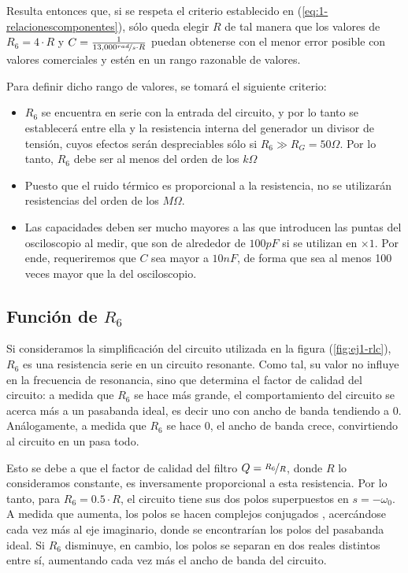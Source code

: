 \documentclass[../../tc_tp3_main.tex]{subfiles}
\begin{document}
 Resulta entonces que, si se respeta el criterio establecido en (\ref{eq:1-relacionescomponentes}), s\'olo queda elegir $R$ de tal manera que los valores de $R_6 = 4\cdot R$ y $C = \frac{1}{13,000 \nicefrac{rad}{s} \cdot R}$ puedan obtenerse con el menor error posible con valores comerciales y est\'en en un rango razonable de valores. \par
 
 Para definir dicho rango de valores, se tomar\'a el siguiente criterio:
 
 \begin{itemize}
	\item  $R_6$ se encuentra en serie con la entrada del circuito, y por lo tanto se establecer\'a entre ella y la resistencia interna del generador un divisor de tensi\'on, cuyos efectos ser\'an despreciables s\'olo si $R_6 \gg R_G = 50\Omega$. Por lo tanto, $R_6$ debe ser al menos del orden de los $k \Omega$
	\item Puesto que el ruido t\'ermico es proporcional a la resistencia, no se utilizar\'an resistencias del orden de los $M\Omega$.
  	\item Las capacidades deben ser mucho mayores a las que introducen las puntas del osciloscopio al medir, que son de alrededor de $100pF$ si se utilizan en $\times 1$. Por ende, requeriremos que $C$ sea mayor a $10nF$, de forma que sea al menos 100 veces mayor que la del osciloscopio. 
 \end{itemize}



\subsection{Funci\'on de $R_6$}


Si consideramos la simplificaci\'on del circuito utilizada en la figura (\ref{fig:ej1-rlc}), $R_6$ es una resistencia serie en un circuito resonante. Como tal, su valor no influye en la frecuencia de resonancia, sino que determina el factor de calidad del circuito: a medida que $R_6$ se hace m\'as grande, el comportamiento del circuito se acerca m\'as a un pasabanda ideal, es decir uno con ancho de banda tendiendo a 0. An\'alogamente, a medida que $R_6$ se hace 0, el ancho de banda crece, convirtiendo al circuito en un pasa todo. \par

Esto se debe a que el factor de calidad del filtro $Q = \nicefrac{R_6}{R}$, donde $R$ lo consideramos constante, es inversamente proporcional a esta resistencia. Por lo tanto, para $R_6=0.5\cdot R$, el circuito tiene sus dos polos superpuestos en $s = -\omega_0$. A medida que aumenta, los polos se hacen complejos conjugados , acerc\'andose cada vez m\'as al eje imaginario, donde se encontrar\'ian los polos del pasabanda ideal. Si $R_6$ disminuye, en cambio, los polos se separan en dos reales distintos entre s\'i,   aumentando cada vez m\'as el ancho de banda del circuito. \par
\end{document}
